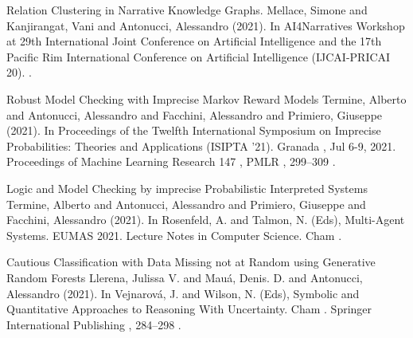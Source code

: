 \begin{cventries}
\begin{cvitems}
\item Relation Clustering in Narrative Knowledge Graphs. Mellace, Simone and Kanjirangat, Vani and Antonucci, Alessandro (2021). In AI4Narratives Workshop at 29th International Joint Conference on Artificial Intelligence and the 17th Pacific Rim International Conference on Artificial Intelligence (IJCAI-PRICAI 20). . 

\item Robust Model Checking with Imprecise Markov Reward Models
Termine, Alberto and Antonucci, Alessandro and Facchini, Alessandro and Primiero, Giuseppe (2021).
In Proceedings of the Twelfth International Symposium on Imprecise Probabilities: Theories and Applications (ISIPTA ’21). Granada , Jul 6-9, 2021.  Proceedings of Machine Learning Research  147 ,  PMLR , 299–309 . 

\item Logic and Model Checking by imprecise Probabilistic Interpreted Systems
Termine, Alberto and Antonucci, Alessandro and Primiero, Giuseppe and Facchini, Alessandro (2021).
In Rosenfeld, A. and Talmon, N. (Eds),  Multi-Agent Systems. EUMAS 2021. Lecture Notes in Computer Science. Cham . 

\item Cautious Classification with Data Missing not at Random using Generative Random Forests
Llerena, Julissa V. and Mauá, Denis. D. and Antonucci, Alessandro (2021).
In Vejnarová, J. and Wilson, N. (Eds),  Symbolic and Quantitative Approaches to Reasoning With Uncertainty. Cham .  Springer International Publishing , 284–298 . 


\end{cvitems}
\end{cventries}
